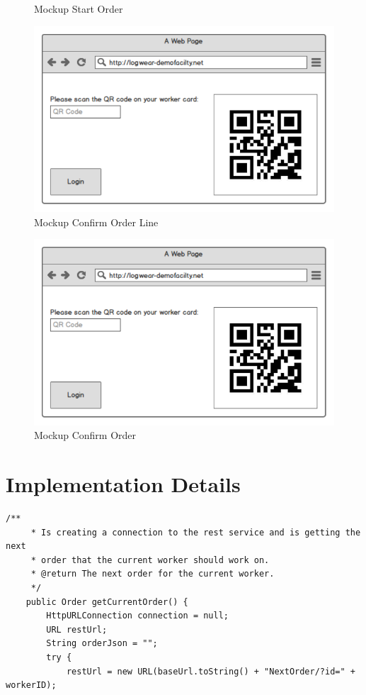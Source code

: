 \begin{appendices}
\begin{figure}
	\caption{Mockup Start Order}
\end{figure}
\begin{figure}
	\includegraphics[width=\textwidth, page=4]{images/WebAppMockups}
	\caption{Mockup Confirm Order Line}
\end{figure}
\begin{figure}
	\includegraphics[width=\textwidth, page=5]{images/WebAppMockups}
	\caption{Mockup Confirm Order}
\end{figure}

\clearpage
\section{Implementation Details}
\lstset{language=Java}
\begin{lstlisting}[frame=single, caption=Java Code to Receive JSON from REST service, label=lst:receiveOrder]
    /**
     * Is creating a connection to the rest service and is getting the next 
     * order that the current worker should work on.
     * @return The next order for the current worker.
     */
    public Order getCurrentOrder() {
        HttpURLConnection connection = null;
        URL restUrl;
        String orderJson = "";
        try {
            restUrl = new URL(baseUrl.toString() + "NextOrder/?id=" + workerID);


\end{lstlisting}
\end{appendices}
